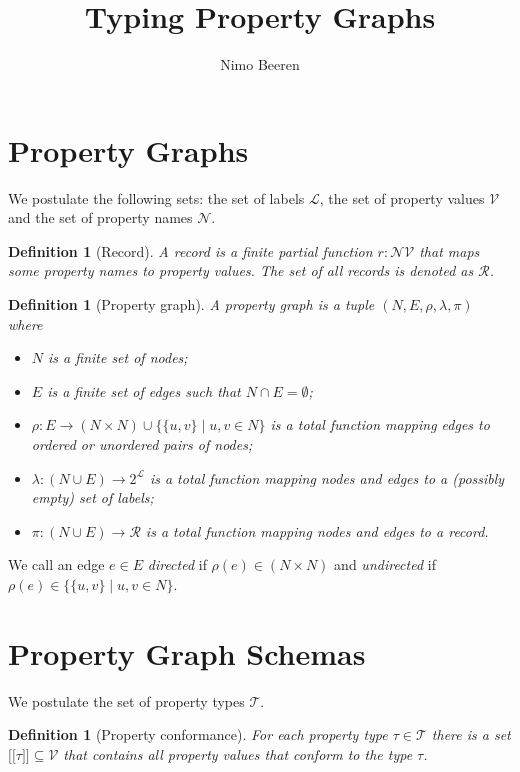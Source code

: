 \documentclass[a4paper]{article}
\title{Typing Property Graphs}
\author{Nimo Beeren}
\makeatletter
\newtheorem{definition}[theorem]{Definition}
\newcommand{\ptype}{\tau}
\newcommand{\ptypes}{\mathcal{T}}
\newcommand{\lsem}{\ensuremath{[\![}}
\newcommand{\rsem}{\ensuremath{]\!]}}
\newcommand{\sem}[1]{\ensuremath{\lsem #1 \rsem}}
\newcommand{\pto}{}%
\DeclareRobustCommand{\pto}{\mathrel{\mathpalette\p@to@gets\to}}
\newcommand{\p@to@gets}[2]{%
  \ooalign{\hidewidth$\m@th#1\mapstochar\mkern5mu$\hidewidth\cr$\m@th#1\to$\cr}%
}
\makeatother
\begin{document}
\section{Property Graphs}

We postulate the following sets: the set of labels $\mathcal{L}$, the set of property values $\mathcal{V}$ and the set of property names $\mathcal{N}$.

\begin{definition}[Record]
  A \emph{record} is a finite partial function $r : \mathcal{N} \pto \mathcal{V}$ that maps some property names to property values. The set of all records is denoted as $\mathcal{R}$.
\end{definition}

\begin{definition}[Property graph]
  A \emph{property graph} is a tuple $(N, E, \rho, \lambda, \pi)$ where
  \begin{itemize}
    \item $N$ is a finite set of nodes;
    \item $E$ is a finite set of edges such that $N \cap E = \emptyset$;
    \item $\rho : E \to (N \times N) \cup \{\{u, v\} \mid u, v \in N\}$ is a total function mapping edges to ordered or unordered pairs of nodes;
    \item $\lambda : (N \cup E) \to 2^{\mathcal{L}}$ is a total function mapping nodes and edges to a (possibly empty) set of labels;
    \item $\pi : (N \cup E) \to \mathcal{R}$ is a total function mapping nodes and edges to a record.
  \end{itemize}
\end{definition}

We call an edge $e \in E$ \emph{directed} if $\rho(e) \in (N \times N)$ and \emph{undirected} if $\rho(e) \in \{\{u, v\} \mid u, v \in N\}$.

\section{Property Graph Schemas}


We postulate the set of property types $\mathcal{T}$.

\begin{definition}[Property conformance]
  For each property type $\ptype \in \ptypes$ there is a set $\sem{\ptype} \subseteq \mathcal{V}$ that contains all property values that \emph{conform} to the type $\ptype$.
\end{definition}
\end{document}
